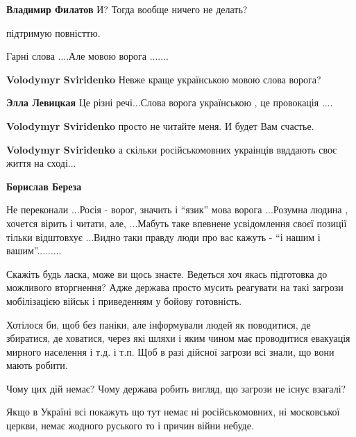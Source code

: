 \begin{itemize}
\textbf{Владимир Филатов} И? Тогда вообще ничего не делать?

підтримую повністтю.

Гарні слова ....Але мовою ворога .......

\begin{itemize} %
\textbf{Volodymyr Sviridenko} Невже краще українською мовою слова ворога?

\textbf{Элла Левицкая} Це різні речі...Слова ворога українською , це провокація ....

\textbf{Volodymyr Sviridenko} просто не читайте меня. И будет Вам счастье.

\textbf{Volodymyr Sviridenko} а скільки російськомовних украінців ввддають своє життя на сході...

\textbf{Борислав Береза} 

Не переконали ...Росія - ворог, значить і \enquote{язик} мова ворога ...Розумна людина
, хочется вірить і читати, але, ...Мабуть таке впевнене усвідомлення своєї
позиції тільки відштовхує ...Видно таки правду люди про вас кажуть - \enquote{і нашим і
вашим}.........

\end{itemize} %


Скажіть будь ласка, може ви щось знаєте. Ведеться хоч якась підготовка до
можливого вторгнення? Адже держава просто мусить реагувати на такі загрози
мобілізацією військ і приведенням у бойову готовність.

Хотілося би, щоб без паніки, але інформували людей як поводитися, де збиратися,
де ховатися, через які шляхи і яким чином має проводитися евакуація мирного
населення і т.д. і т.п. Щоб в разі дійсної загрози всі знали, що вони мають
робити.

Чому цих дій немає? Чому держава робить вигляд, що загрози не існує взагалі?


Якщо в Україні всі покажуть що тут немає ні російськомовних, ні московської
церкви, немає жодного руського то і причин війни небуде.


\end{itemize} %
